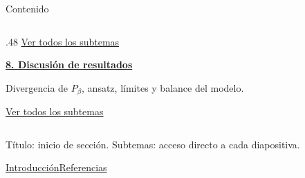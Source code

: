 \begin{frame}[label=nav-content]{Contenido}
\begin{columns}[T,onlytextwidth]
\begin{column}{.48\textwidth}
{\scriptsize\hyperlink{nav-index-7-1}{Ver todos los subtemas}}\par\medskip
\hyperlink{nav-map-8-0}{\textbf{8. Discusión de resultados}}\par
Divergencia de $P_\beta$, ansatz, límites y balance del modelo.\par
{\scriptsize\hyperlink{nav-index-8-1}{Ver todos los subtemas}}\par\medskip
\end{column}
\end{columns}
\vfill
{\scriptsize Título: inicio de sección. Subtemas: acceso directo a cada diapositiva.\par
\hyperlink{nav-index-0-1}{Introducción}\qquad\hyperlink{nav-frame-124}{Referencias}}
\end{frame}
